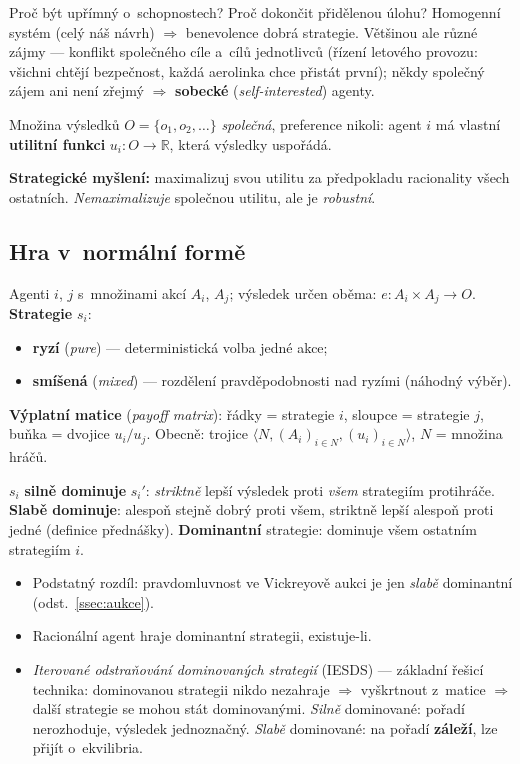 \documentclass[11pt,a4paper]{article}
\theoremstyle{definition}
\begin{document}
Proč být upřímný o~schopnostech? Proč dokončit přidělenou úlohu? Homogenní systém (celý
náš návrh) $\Rightarrow$ benevolence dobrá strategie. Většinou ale různé zájmy ---
konflikt společného cíle a~cílů jednotlivců (řízení letového provozu: všichni chtějí
bezpečnost, každá aerolinka chce přistát první); někdy společný zájem ani není zřejmý
$\Rightarrow$ \textbf{sobecké} (\emph{self-interested}) agenty.

\begin{defbox}
Množina výsledků $O = \{o_1, o_2, \dots\}$ \emph{společná}, preference nikoli: agent $i$ má
vlastní \textbf{utilitní funkci} $u_i : O \to \mathbb{R}$, která výsledky uspořádá.

\textbf{Strategické myšlení:} maximalizuj svou utilitu za předpokladu racionality všech
ostatních. \emph{Nemaximalizuje} společnou utilitu, ale je \emph{robustní}.
\end{defbox}
\subsection{Hra v~normální formě}

\begin{defbox}
Agenti $i$, $j$ s~množinami akcí $A_i$, $A_j$; výsledek určen oběma: $e : A_i \times A_j \to O$.
\textbf{Strategie} $s_i$:
\begin{itemize}
\item \textbf{ryzí} (\emph{pure}) --- deterministická volba jedné akce;
\item \textbf{smíšená} (\emph{mixed}) --- rozdělení pravděpodobnosti nad ryzími (náhodný výběr).
\end{itemize}
\textbf{Výplatní matice} (\emph{payoff matrix}): řádky = strategie $i$, sloupce = strategie $j$,
buňka = dvojice $u_i / u_j$.
Obecně: trojice $\langle N, (A_i)_{i \in N}, (u_i)_{i \in N}\rangle$, $N$ = množina hráčů.
\end{defbox}

\begin{defbox}[Dominance]
$s_i$ \textbf{silně dominuje} $s_i'$: \emph{striktně} lepší výsledek proti \emph{všem} strategiím
protihráče. \textbf{Slabě dominuje}: alespoň stejně dobrý proti všem, striktně lepší alespoň proti
jedné (definice přednášky). \textbf{Dominantní} strategie: dominuje všem ostatním strategiím $i$.
\begin{itemize}
\item Podstatný rozdíl: pravdomluvnost ve Vickreyově aukci je jen \emph{slabě} dominantní
  (odst.~\ref{ssec:aukce}).
\item Racionální agent hraje dominantní strategii, existuje-li.
\item \emph{Iterované odstraňování dominovaných strategií} (IESDS) --- základní řešicí technika:
  dominovanou strategii nikdo nezahraje $\Rightarrow$ vyškrtnout z~matice $\Rightarrow$ další
  strategie se mohou stát dominovanými. \emph{Silně} dominované: pořadí nerozhoduje, výsledek
  jednoznačný. \emph{Slabě} dominované: na pořadí \textbf{záleží}, lze přijít o~ekvilibria.
\end{itemize}
\end{defbox}
\end{document}
